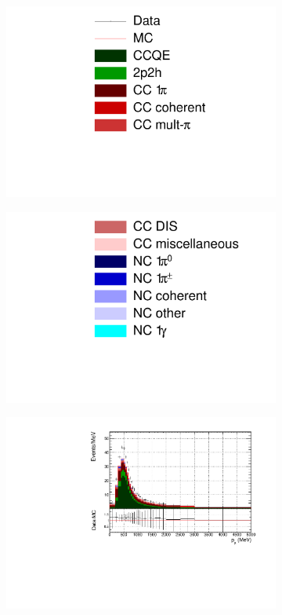 \begin{figure}
\centering
\begin{subfigure}{.35\textwidth}
  \centering
  \includegraphics[width=0.7\linewidth]{figs/legend}
\end{subfigure}
\begin{subfigure}{.35\textwidth}
  \centering
  \includegraphics[width=0.7\linewidth]{figs/legend2}
\end{subfigure}
\begin{subfigure}{.32\textwidth}
  \centering
  \includegraphics[width=0.95\linewidth]{figs/FGD1_numuCC_0pi_p}

\end{subfigure}
\end{figure}
